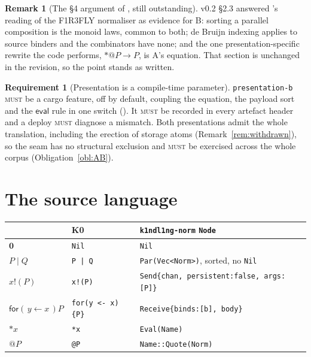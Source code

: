 \documentclass[11pt,a4paper]{article}
\makeatletter
\newcommand{\code}[1]{\texttt{#1}}
\newcommand{\MUST}{\textsc{must}}
\newcommand{\quo}[1]{@#1}
\newcommand{\drp}[1]{{*}#1}
\newcommand{\inp}[3]{\mathsf{for}(\,#1 \leftarrow #2\,)#3}
\newcommand{\out}[2]{#1!(#2)}
\newcommand{\nil}{\mathbf{0}}
\theoremstyle{definition}
\newtheorem{requirement}[definition]{Requirement}
\newtheorem{remark}[definition]{Remark}
\theoremstyle{plain}
\makeatother
\begin{document}
\begin{remark}[The \S4 argument of \protect\cite{draft3}, still outstanding]
\label{rem:s4}
v0.2 \S2.3 answered \cite[\S4]{draft3}'s reading of the F1R3FLY normaliser as
evidence for B: sorting a parallel composition is the monoid laws, common to
both; de Bruijn indexing applies to source binders and the combinators have
none; and the one presentation-specific rewrite the code performs,
$\drp{\quo{P}} \to P$, is A's equation. That section is unchanged in the
revision, so the point stands as written.
\end{remark}

\begin{requirement}[Presentation is a compile-time parameter]\label{req:pseam}
\code{presentation-b} \MUST{} be a cargo feature, off by default, coupling the
equation, the payload sort and the $\mathsf{eval}$ rule in one switch
(\cite[Rem.~3.2]{draft3}). It \MUST{} be recorded in every artefact header and
a deploy \MUST{} diagnose a mismatch. Both presentations admit the whole
translation, including the erection of storage atoms
(Remark~\ref{rem:withdrawn}), so the seam has no structural exclusion and
\MUST{} be exercised across the whole corpus (Obligation~\ref{obl:AB}).
\end{requirement}

\section{The source language}\label{sec:source}

\begin{center}
\begin{tabular}{@{}lll@{}}
\toprule
\cite[Def.~2.1]{draft3} & K0 & \code{k1ndl1ng-norm} \code{Node}\\
\midrule
$\nil$ & \code{Nil} & \code{Nil}\\
$P \mid Q$ & \code{P | Q} & \code{Par(Vec<Norm>)}, sorted, no \code{Nil}\\
$\out{x}{P}$ & \code{x!(P)} & \code{Send\{chan, persistent:false, args:[P]\}}\\
$\inp{y}{x}{P}$ & \code{for(y <- x)\{P\}} & \code{Receive\{binds:[b], body\}}\\
$\drp{x}$ & \code{*x} & \code{Eval(Name)}\\
$\quo{P}$ & \code{@P} & \code{Name::Quote(Norm)}\\
\bottomrule
\end{tabular}
\end{center}
\end{document}
